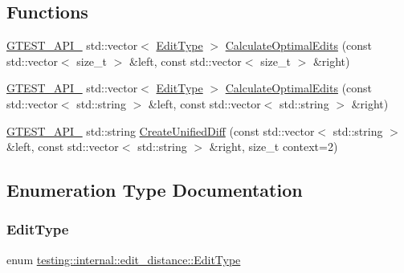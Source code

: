 \subsection*{Functions}
\begin{DoxyCompactItemize}
\item 
\hyperlink{gtest-port_8h_aa73be6f0ba4a7456180a94904ce17790}{G\+T\+E\+S\+T\+\_\+\+A\+P\+I\+\_\+} std\+::vector$<$ \hyperlink{namespacetesting_1_1internal_1_1edit__distance_ad46aa6da12aec1a3f166310478b53a08}{Edit\+Type} $>$ \hyperlink{namespacetesting_1_1internal_1_1edit__distance_a26323b4c2a29ea8e187aafbd4d2275db}{Calculate\+Optimal\+Edits} (const std\+::vector$<$ size\+\_\+t $>$ \&left, const std\+::vector$<$ size\+\_\+t $>$ \&right)
\item 
\hyperlink{gtest-port_8h_aa73be6f0ba4a7456180a94904ce17790}{G\+T\+E\+S\+T\+\_\+\+A\+P\+I\+\_\+} std\+::vector$<$ \hyperlink{namespacetesting_1_1internal_1_1edit__distance_ad46aa6da12aec1a3f166310478b53a08}{Edit\+Type} $>$ \hyperlink{namespacetesting_1_1internal_1_1edit__distance_a32267b2ae24de1de175ac8217406877d}{Calculate\+Optimal\+Edits} (const std\+::vector$<$ std\+::string $>$ \&left, const std\+::vector$<$ std\+::string $>$ \&right)
\item 
\hyperlink{gtest-port_8h_aa73be6f0ba4a7456180a94904ce17790}{G\+T\+E\+S\+T\+\_\+\+A\+P\+I\+\_\+} std\+::string \hyperlink{namespacetesting_1_1internal_1_1edit__distance_ac4c24a581ff433d7aca7ed12c9133fb1}{Create\+Unified\+Diff} (const std\+::vector$<$ std\+::string $>$ \&left, const std\+::vector$<$ std\+::string $>$ \&right, size\+\_\+t context=2)
\end{DoxyCompactItemize}


\subsection{Enumeration Type Documentation}
\mbox{\label{namespacetesting_1_1internal_1_1edit__distance_ad46aa6da12aec1a3f166310478b53a08}} 
\subsubsection{\texorpdfstring{Edit\+Type}{EditType}}
{\footnotesize\ttfamily enum \hyperlink{namespacetesting_1_1internal_1_1edit__distance_ad46aa6da12aec1a3f166310478b53a08}{testing\+::internal\+::edit\+\_\+distance\+::\+Edit\+Type}}


